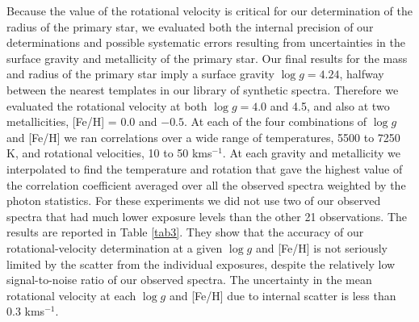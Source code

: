 \documentclass[12pt, preprint]{aastex}
\newcommand\kms{\ifmmode{\rm km\thinspace s^{-1}}\else km\thinspace s$^{-1}$\fi}
\begin{document}
Because the value of the rotational velocity is critical for our
determination of the radius of the primary star, we evaluated both the
internal precision of our determinations and possible systematic
errors resulting from uncertainties in the surface gravity and
metallicity of the primary star. Our final results for the mass and
radius of the primary star imply a surface gravity $\log g = 4.24$,
halfway between the nearest templates in our library of synthetic
spectra. Therefore we evaluated the rotational velocity at both $\log
g = 4.0$ and 4.5, and also at two metallicities, [Fe/H] = 0.0 and
$-0.5$. At each of the four combinations of $\log g$ and [Fe/H] we
ran correlations over a wide range of temperatures, 5500 to 7250 K,
and rotational velocities, 10 to 50 \kms. At each gravity and
metallicity we interpolated to find the temperature and rotation that gave
the highest value of the correlation coefficient averaged over all the
observed spectra weighted by the photon statistics. For these
experiments we did not use two of our observed spectra that had much
lower exposure levels than the other 21 observations. The results are
reported in Table \ref{tab3}. They show that the accuracy of our
rotational-velocity determination at a given $\log g$ and [Fe/H] is
not seriously limited by the scatter from the individual exposures,
despite the relatively low signal-to-noise ratio of our observed
spectra. The uncertainty in the mean rotational velocity at each
$\log g$ and [Fe/H] due to internal scatter is less than 0.3 \kms.
\end{document}
